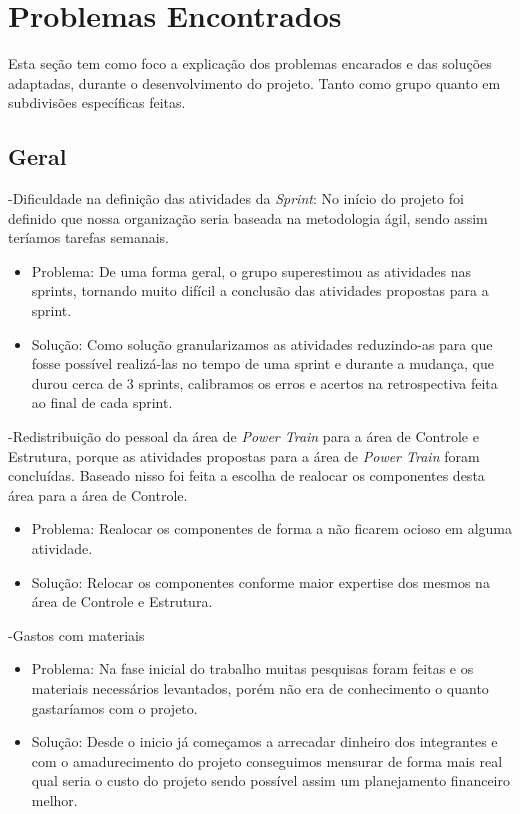 \chapter[Problemas Encontrados]{Problemas Encontrados}

Esta seção tem como foco a explicação dos problemas encarados e das soluções adaptadas, durante o desenvolvimento do projeto. Tanto como grupo quanto em subdivisões específicas feitas.

 \section{Geral}

-Dificuldade na definição das atividades da \textit{Sprint}: No início do projeto foi definido que nossa organização seria baseada na metodologia ágil, sendo assim teríamos tarefas semanais.
    \begin{itemize}
      \item Problema: De uma forma geral, o grupo superestimou as atividades nas sprints, tornando muito difícil a conclusão das atividades propostas para a sprint.
	  \item Solução: Como solução granularizamos as atividades reduzindo-as para que fosse possível realizá-las no tempo de uma sprint e durante a mudança, que durou cerca de 3 sprints, calibramos os erros e acertos na retrospectiva feita ao final de cada sprint.

    \end{itemize}

-Redistribuição do pessoal da área de \textit{Power Train} para a área de Controle e Estrutura, porque as atividades propostas para a área de \textit{Power Train} foram concluídas. Baseado nisso foi feita a escolha de realocar os componentes desta área para a área de Controle.
    \begin{itemize}
      \item Problema: Realocar os componentes de forma a não ficarem ocioso em alguma atividade.
	  \item Solução: Relocar os componentes conforme maior expertise dos mesmos na área de Controle e Estrutura.
    \end{itemize}

-Gastos com materiais
    \begin{itemize}
  \item Problema: Na fase inicial do trabalho muitas pesquisas foram feitas e os materiais necessários levantados, porém não era de conhecimento o quanto gastaríamos com o projeto.
  \item Solução: Desde o inicio já começamos a arrecadar dinheiro dos integrantes e com o amadurecimento do projeto conseguimos mensurar de forma mais real qual seria o custo do projeto sendo possível assim um planejamento financeiro melhor.

    \end{itemize}

